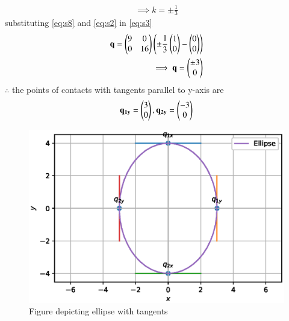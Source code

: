 \documentclass[journal,12pt,twocolumn]{IEEEtran}
\begin{document}
\begin{enumerate}[label = (\alph*)]
\begin{align}
\label{eq:s8}
\implies k = \pm \frac{1}{3}
\end{align}
substituting \eqref{eq:s8} and \eqref{eq:s2} in \eqref{eq:s3}
\begin{align}
\mathbf{q} = \begin{pmatrix}9&0\\0&16\end{pmatrix}\left(\pm\frac{1}{3}\begin{pmatrix}1\\0\end{pmatrix}-\begin{pmatrix}0\\0\end{pmatrix}\right)\\
\implies \mathbf{q} = \begin{pmatrix}\pm 3\\ 0\end{pmatrix}
\end{align}
$\therefore$ the points of contacts with tangents parallel to y-axis are
\begin{align}
\mathbf{q_{1y}} = \begin{pmatrix}3\\0\end{pmatrix}, \mathbf{q_{2y}} = \begin{pmatrix}-3\\0\end{pmatrix}
\end{align}
\end{enumerate}
\begin{figure}[!ht]
	\centering
	\includegraphics[width=\columnwidth]{ellipse.eps}
	\captionsetup{labelformat=empty}
	\caption{Figure depicting ellipse with tangents}
	\label{myfig}
\end{figure}
\end{document}
